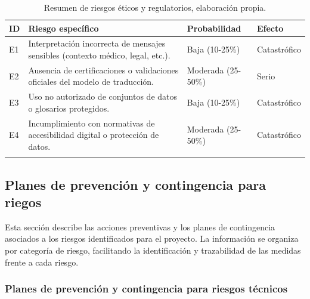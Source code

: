 \begin{longtable}{|>{\centering\arraybackslash}p{0.8cm}|>{\raggedright\arraybackslash}p{3.5cm}|>{\raggedright\arraybackslash}p{5.1cm}|>{\raggedright\arraybackslash}p{5.1cm}|}
	\hline
	\textbf{ID} & \textbf{Riesgo específico} & \textbf{Probabilidad} & \textbf{Efecto} \\
	\hline
	E1 & Interpretación incorrecta de mensajes sensibles (contexto médico, legal, etc.). & Baja (10-25\%) & Catastrófico \\
	\hline
	E2 & Ausencia de certificaciones o validaciones oficiales del modelo de traducción. & Moderada (25-50\%) & Serio \\
	\hline
	E3 & Uso no autorizado de conjuntos de datos o glosarios protegidos. & Baja (10-25\%) & Catastrófico \\
	\hline
	E4 & Incumplimiento con normativas de accesibilidad digital o protección de datos. & Moderada (25-50\%) & Catastrófico \\
	\hline
\caption[Resumen de riesgos éticos y regulatorios]{Resumen de riesgos éticos y regulatorios, elaboración propia.} \label{tab:riesgos_eticos_resumen} \\
\end{longtable}

\newpage
\subsection{Planes de prevención y contingencia para riegos}

Esta sección describe las acciones preventivas y los planes de contingencia asociados a los riesgos identificados para el proyecto. La información se organiza por categoría de riesgo, facilitando la identificación y trazabilidad de las medidas frente a cada riesgo.

\subsubsection{Planes de prevención y contingencia para riesgos técnicos}

\setlength{\tabcolsep}{4pt}
\renewcommand{\arraystretch}{1.2}

